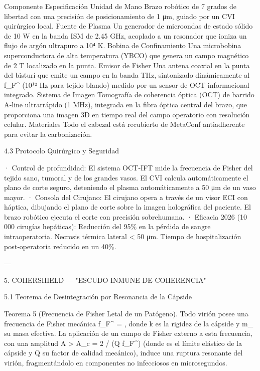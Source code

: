 \documentclass[12pt,twoside]{book}
\begin{document}
Componente Especificación
Unidad de Mano Brazo robótico de 7 grados de libertad con una precisión de posicionamiento de 1 μm, guiado por un CVI quirúrgico local.
Fuente de Plasma Un generador de microondas de estado sólido de 10 W en la banda ISM de 2.45 GHz, acoplado a un resonador que ioniza un flujo de argón ultrapuro a 10⁴ K.
Bobina de Confinamiento Una microbobina superconductora de alta temperatura (YBCO) que genera un campo magnético de 2 T localizado en la punta.
Emisor de Fisher Una antena coaxial en la punta del bisturí que emite un campo en la banda THz, sintonizado dinámicamente al  f_F^{}  (10¹² Hz para tejido blando) medido por un sensor de OCT informacional integrado.
Sistema de Imagen Tomografía de coherencia óptica (OCT) de barrido A‑line ultrarrápido (1 MHz), integrada en la fibra óptica central del brazo, que proporciona una imagen 3D en tiempo real del campo operatorio con resolución celular.
Materiales Todo el cabezal está recubierto de MetaConf antiadherente para evitar la carbonización.

4.3 Protocolo Quirúrgico y Seguridad

· Control de profundidad: El sistema OCT‑IFT mide la frecuencia de Fisher del tejido sano, tumoral y de los grandes vasos. El CVI calcula automáticamente el plano de corte seguro, deteniendo el plasma automáticamente a 50 μm de un vaso mayor.
· Consola del Cirujano: El cirujano opera a través de un visor ECI con háptica, dibujando el plano de corte sobre la imagen holográfica del paciente. El brazo robótico ejecuta el corte con precisión sobrehumana.
· Eficacia 2026 (10 000 cirugías hepáticas): Reducción del 95\% en la pérdida de sangre intraoperatoria. Necrosis térmica lateral < 50 μm. Tiempo de hospitalización post‑operatoria reducido en un 40\%.

---

5. COHERSHIELD — "ESCUDO INMUNE DE COHERENCIA"

5.1 Teorema de Desintegración por Resonancia de la Cápside

Teorema 5 (Frecuencia de Fisher Letal de un Patógeno). Todo virión posee una frecuencia de Fisher mecánica  f_F^{} =  , donde  k  es la rigidez de la cápside y  m_{}  su masa efectiva. La aplicación de un campo de Fisher externo a esta frecuencia, con una amplitud  A > A_c = 2 \gamma / (Q f_F^{})  (donde  \gamma  es el límite elástico de la cápside y  Q  su factor de calidad mecánico), induce una ruptura resonante del virión, fragmentándolo en componentes no infecciosos en microsegundos.
\end{document}
